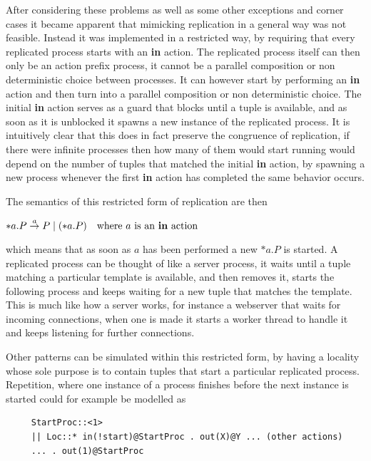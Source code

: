 	After considering these problems as well as some other exceptions and corner 
	cases it became apparent that	mimicking replication in a general way was not 
	feasible. Instead it was implemented in a restricted way, by requiring that 
	every replicated process starts with an \textbf{in} action. The replicated 
	process itself can then only be an action prefix process, it cannot be a 
	parallel composition or non deterministic choice between processes. It can 
	however start by performing an \textbf{in} action and then turn into a 
	parallel composition or non deterministic choice. The initial \textbf{in} 
	action serves as a guard that blocks until a tuple is available, and as soon 
	as it is unblocked it spawns a new instance of the replicated process. It is 
	intuitively clear that this does in fact preserve the congruence of 
	replication, if there were infinite processes then how many of them would 
	start running would depend on the number of tuples that matched the initial 
	\textbf{in} action, by spawning a new process whenever the first \textbf{in} 
	action has completed the same behavior occurs. 
	
	The semantics of this restricted form of replication are then
	\begin{center}
	$*a . P \infarrow{a} P \mid (*a . P)\ \ \ \mathrm{where}\ a\ \mathrm{is\ an} \ \mathbf{in}\ \mathrm{action}$
	\end{center}
	
	which means that as soon as $a$ has been performed a new $*a . P$ is started.
	A replicated process can be thought of like a server process, it waits until 
	a tuple matching a particular template is available, and then removes it, 
	starts the following process and keeps waiting for a new tuple that matches 
	the template. This is much like how a server works, for instance a webserver 
	that waits for incoming connections, when one is made it starts a worker 
	thread to handle it and keeps listening for further connections.
	
	Other patterns can be simulated within this restricted form, by having a 
	locality whose sole purpose is to contain tuples that start a particular 
	replicated process. Repetition, where one instance of a process finishes 
	before the next instance is started could for example be modelled as
	
		\begin{verbatim}
     StartProc::<1>
     || Loc::* in(!start)@StartProc . out(X)@Y ... (other actions) 
     ... . out(1)@StartProc
		\end{verbatim}
		
